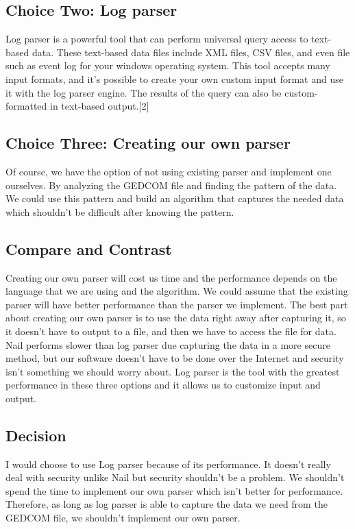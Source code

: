 \documentclass[onecolumn, draftclsnofoot, 10pt, compsoc]{IEEEtran}
\begin{document}
\subsection{Choice Two: Log parser}
\begin{singlespace}
Log parser is a powerful tool that can perform universal query access to text-based data. These text-based data files include XML files, CSV files, and even file such as event log for your windows operating system. This tool accepts many input formats, and it's possible to create your own custom input format and use it with the log parser engine. The results of the query can also be custom-formatted in text-based output.[2]
\end{singlespace}
 

\subsection{Choice Three: Creating our own parser}
\begin{singlespace}
Of course, we have the option of not using existing parser and implement one ourselves. By analyzing the GEDCOM file and finding the pattern of the data. We could use this pattern and build an algorithm that captures the needed data which shouldn't be difficult after knowing the pattern.
\end{singlespace}

\subsection{Compare and Contrast}
\begin{singlespace}
Creating our own parser will cost us time and the performance depends on the language that we are using and the algorithm. We could assume that the existing parser will have better performance than the parser we implement. The best part about creating our own parser is to use the data right away after capturing it, so it doesn't have to output to a file, and then we have to access the file for data. Nail performs slower than log parser due capturing the data in a more secure method, but our software doesn't have to be done over the Internet and security isn't something we should worry about. Log parser is the tool with the greatest performance in these three options and it allows us to customize input and output.
\end{singlespace}

\subsection{Decision}
\begin{singlespace}
I would choose to use Log parser because of its performance. It doesn't really deal with security unlike Nail but security shouldn't be a problem. We shouldn't spend the time to implement our own parser which isn't better for performance. Therefore, as long as log parser is able to capture the data we need from the GEDCOM file, we shouldn't implement our own parser.
\end{singlespace}
\end{document}
